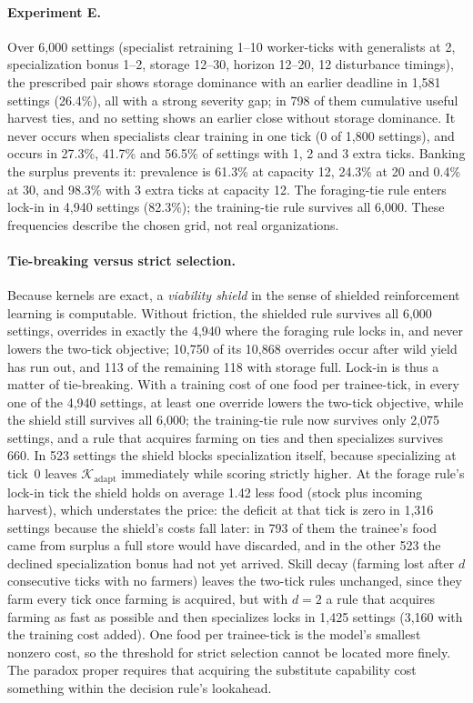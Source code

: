 \documentclass[11pt]{article}
\theoremstyle{plain}
\theoremstyle{definition}
\newcommand{\K}{\mathcal{K}}
\newcommand{\adapt}{\mathrm{adapt}}
\begin{document}
\paragraph{Experiment E.} Over 6,000 settings (specialist retraining 1--10 worker-ticks with generalists at 2, specialization bonus 1--2, storage 12--30, horizon 12--20, 12 disturbance timings), the prescribed pair shows storage dominance with an earlier deadline in 1,581 settings (26.4\%), all with a strong severity gap; in 798 of them cumulative useful harvest ties, and no setting shows an earlier close without storage dominance. It never occurs when specialists clear training in one tick (0 of 1,800 settings), and occurs in 27.3\%, 41.7\% and 56.5\% of settings with 1, 2 and 3 extra ticks. Banking the surplus prevents it: prevalence is 61.3\% at capacity 12, 24.3\% at 20 and 0.4\% at 30, and 98.3\% with 3 extra ticks at capacity 12. The foraging-tie rule enters lock-in in 4,940 settings (82.3\%); the training-tie rule survives all 6,000. These frequencies describe the chosen grid, not real organizations.

\paragraph{Tie-breaking versus strict selection.} Because kernels are exact, a \emph{viability shield} in the sense of shielded reinforcement learning \citep{AlshiekhEtAl2018} is computable. Without friction, the shielded rule survives all 6,000 settings, overrides in exactly the 4,940 where the foraging rule locks in, and never lowers the two-tick objective; 10,750 of its 10,868 overrides occur after wild yield has run out, and 113 of the remaining 118 with storage full. Lock-in is thus a matter of tie-breaking. With a training cost of one food per trainee-tick, in every one of the 4,940 settings, at least one override lowers the two-tick objective, while the shield still survives all 6,000; the training-tie rule now survives only 2,075 settings, and a rule that acquires farming on ties and then specializes survives 660. In 523 settings the shield blocks specialization itself, because specializing at tick~0 leaves $\K_\adapt$ immediately while scoring strictly higher. At the forage rule's lock-in tick the shield holds on average 1.42 less food (stock plus incoming harvest), which understates the price: the deficit at that tick is zero in 1,316 settings because the shield's costs fall later: in 793 of them the trainee's food came from surplus a full store would have discarded, and in the other 523 the declined specialization bonus had not yet arrived. Skill decay (farming lost after $d$ consecutive ticks with no farmers) leaves the two-tick rules unchanged, since they farm every tick once farming is acquired, but with $d=2$ a rule that acquires farming as fast as possible and then specializes locks in 1,425 settings (3,160 with the training cost added). One food per trainee-tick is the model's smallest nonzero cost, so the threshold for strict selection cannot be located more finely. The paradox proper requires that acquiring the substitute capability cost something within the decision rule's lookahead.
\end{document}
